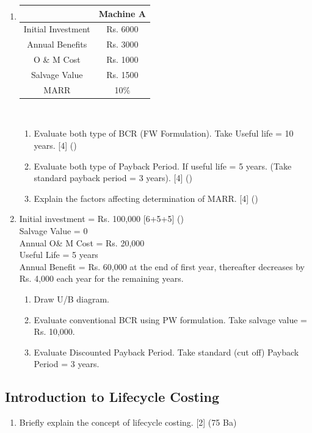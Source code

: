 \documentclass[12pt]{article}
\begin{document}
\begin{enumerate}[noitemsep, topsep = 0pt]
	\item \begin{tabular}{|c|c|}
		\hline
		 & Machine A \\ \hline
		Initial Investment & Rs. 6000 \\ \hline
		Annual Benefits & Rs. 3000 \\ \hline
		O \& M Cost & Rs. 1000 \\ \hline
		Salvage Value & Rs. 1500 \\ \hline
		MARR & 10\% \\ \hline
	\end{tabular}\\[0pt]
	\begin{enumerate}[noitemsep, topsep = 0pt, label = \alph*.]
		\item Evaluate both type of BCR (FW Formulation). Take Useful life = 10 years. \hfill [4] ()
		\item Evaluate both type of Payback Period. If useful life = 5 years. (Take standard payback period = 3 years). \hfill [4] ()
		\item Explain the factors affecting determination of MARR. \hfill [4] ()
	\end{enumerate}
	
	\item Initial investment = Rs. 100,000 \hfill [6+5+5] ()\\
	Salvage Value = 0\\
	Annual O\& M Cost = Rs. 20,000\\
	Useful Life = 5 years\\
	Annual Benefit = Rs. 60,000 at the end of first year, thereafter decreases by Rs. 4,000 each year for the remaining years.
	\begin{enumerate}[noitemsep, topsep = 0pt, label = \alph*.]
		\item Draw U/B diagram.
		\item Evaluate conventional BCR using PW formulation. Take salvage value = Rs. 10,000.
		\item Evaluate Discounted Payback Period. Take standard (cut off) Payback Period = 3 years.
	\end{enumerate}
\end{enumerate}

\subsection{Introduction to Lifecycle Costing}
\begin{enumerate}[noitemsep, topsep = 0pt]
	\item Briefly explain the concept of lifecycle costing. \hfill [2] (75 Ba)
\end{enumerate}
\end{document}
